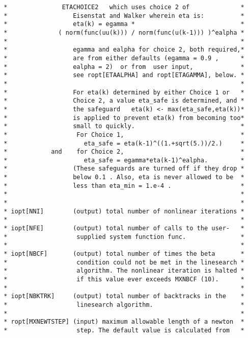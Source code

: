 \begin{verbatim}
 *               ETACHOICE2   which uses choice 2 of              *
 *                  Eisenstat and Walker wherein eta is:          *
 *                  eta(k) = egamma *                             *
 *              ( norm(func(uu(k))) / norm(func(u(k-1))) )^ealpha *
 *                                                                *
 *                  egamma and ealpha for choice 2, both required,*
 *                  are from either defaults (egamma = 0.9 ,      *
 *                  ealpha = 2)  or from  user input,             *
 *                  see ropt[ETAALPHA] and ropt[ETAGAMMA], below. *
 *                                                                *
 *                  For eta(k) determined by either Choice 1 or   *
 *                  Choice 2, a value eta_safe is determined, and *
 *                  the safeguard   eta(k) <- max(eta_safe,eta(k))*
 *                  is applied to prevent eta(k) from becoming too*
 *                  small to quickly.                             *
 *                   For Choice 1,                                *
 *                     eta_safe = eta(k-1)^((1.+sqrt(5.))/2.)     *
 *            and    for Choice 2,                                *
 *                     eta_safe = egamma*eta(k-1)^ealpha.         *
 *                  (These safeguards are turned off if they drop *
 *                  below 0.1 . Also, eta is never allowed to be  *
 *                  less than eta_min = 1.e-4 .                   *
 *                                                                *
 *                                                                *
 * iopt[NNI]        (output) total number of nonlinear iterations *
 *                                                                *
 * iopt[NFE]        (output) total number of calls to the user-   *
 *                   supplied system function func.               *
 *                                                                *
 * iopt[NBCF]       (output) total number of times the beta       *
 *                   condition could not be met in the linesearch *
 *                   algorithm. The nonlinear iteration is halted *
 *                   if this value ever exceeds MXNBCF (10).      *
 *                                                                *
 * iopt[NBKTRK]     (output) total number of backtracks in the    *
 *                   linesearch algorithm.                        *
 *                                                                *
 * ropt[MXNEWTSTEP] (input) maximum allowable length of a newton  *
 *                   step. The default value is calculated from   *

\end{verbatim}
